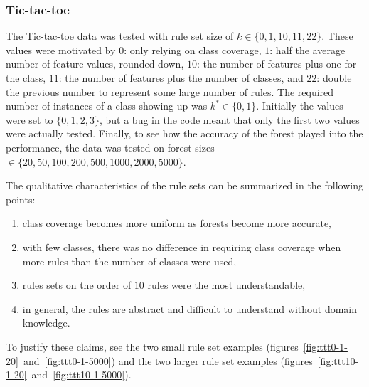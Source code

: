 \documentclass[10pt]{article}
\begin{document}
\subsubsection{Tic-tac-toe}
The Tic-tac-toe data was tested with rule set size of $k \in \{0, 1, 10, 11, 22\}$. These values were motivated by $0$: only relying on class coverage, $1$: half the average number of feature values, rounded down, $10$: the number of features plus one for the class, $11$: the number of features plus the number of classes, and $22$: double the previous number to represent some large number of rules. The required number of instances of a class showing up was $k^* \in \{0,1\}$. Initially the values were set to $\{0,1,2,3\}$, but a bug in the code meant that only the first two values were actually tested. Finally, to see how the accuracy of the forest played into the performance, the data was tested on forest sizes $\in \{20, 50, 100, 200, 500, 1000, 2000, 5000\}$. 

The qualitative characteristics of the rule sets can be summarized in the following points:
\begin{enumerate}
\item class coverage becomes more uniform as forests become more accurate,
\item with few classes, there was no difference in requiring class coverage when more rules than the number of classes were used, 
\item rules sets on the order of $10$ rules were the most understandable,
\item in general, the rules are abstract and difficult to understand without domain knowledge.
\end{enumerate}
To justify these claims, see the two small rule set examples (figures~\ref{fig:ttt0-1-20}~and~\ref{fig:ttt0-1-5000}) and the two larger rule set examples (figures~\ref{fig:ttt10-1-20}~and~\ref{fig:ttt10-1-5000}). 
\end{document}
